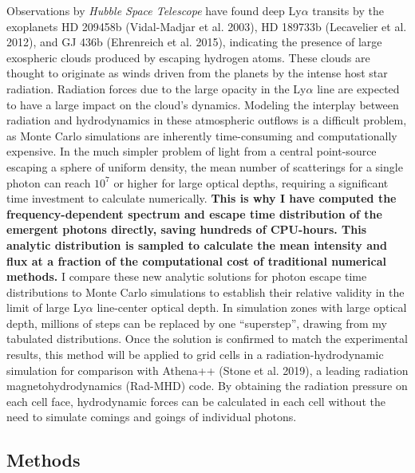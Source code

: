 \documentclass[onecolumn]{aastex63}
\begin{document}
Observations by \textit{Hubble Space Telescope} have found deep Ly$\alpha$ transits by the exoplanets HD 209458b (Vidal-Madjar et al. 2003), HD 189733b (Lecavelier et al. 2012), and  GJ 436b (Ehrenreich et al. 2015), indicating the presence of large exospheric clouds produced by escaping hydrogen atoms. These clouds are thought to originate as winds driven from the planets by the intense host star radiation. Radiation forces due to the large opacity in the Ly$\alpha$ line are expected to have a large impact on the cloud's dynamics. Modeling the interplay between radiation and hydrodynamics in these atmospheric outflows is a difficult problem, as Monte Carlo simulations are inherently time-consuming and computationally expensive. In the much simpler problem of light from a central point-source escaping a sphere of uniform density, the mean number of scatterings for a single photon can reach $10^{7}$ or higher for large optical depths, requiring a significant time investment to calculate numerically. \textbf{This is why I have computed the frequency-dependent spectrum and escape time distribution of the emergent photons directly, saving hundreds of CPU-hours. This analytic distribution is sampled to calculate the mean intensity and flux at a fraction of the computational cost of traditional numerical methods.} I compare these new analytic solutions for photon escape time distributions to Monte Carlo simulations to establish their relative validity in the limit of large Ly$\alpha$ line-center optical depth. In simulation zones with large optical depth, millions of steps can be replaced by one ``superstep'', drawing from my tabulated distributions. Once the solution is confirmed to match the experimental results, this method will be applied to grid cells in a radiation-hydrodynamic simulation for comparison with Athena++ (Stone et al. 2019), a leading radiation magnetohydrodynamics (Rad-MHD) code. By obtaining the radiation pressure on each cell face, hydrodynamic forces can be calculated in each cell without the need to simulate comings and goings of individual photons.

\subsection{Methods}
\end{document}
